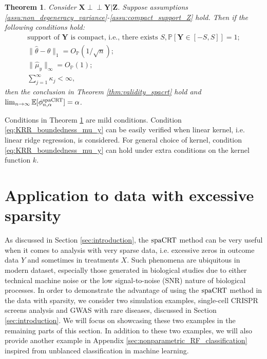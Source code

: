 \documentclass[12pt]{article}
\newtheorem{theorem}{Theorem}
\theoremstyle{definition}
\newcommand{\indep}{\perp \!\!\! \perp}
\def\P{\mathbb{P}}
\def\P{\mathbb{P}}
\newcommand{\E}{\mathbb E}								%
\renewcommand{\P}{\mathbb{P}}							%
\newcommand{\prx}{\bm X}								%
\newcommand{\prz}{\bm Z}								%
\newcommand{\pry}{{\bm Y}}								%
\newcommand{\spacrt}{\textnormal{spaCRT}}               %
\begin{document}
\begin{theorem}\label{thm:nonparametric_ml_spacrt}
  Consider $\prx\indep\pry|\prz$. Suppose assumptions \ref{assu:non_degeneracy_variance}-\ref{assu:compact_support_Z} hold. Then if the following conditions hold:
  \begin{align}
    \text{support of $\pry$ is compact, i.e., there exists }S, \P[\pry\in[-S,S]]=1;\label{eq:KRR_compact_support_Y}\\
    \|\widehat{\theta}-\theta\|_1=O_\P(1/\sqrt{n});\label{eq:KRR_mu_x_consistency}\\
    \|\widehat{\mu}_{y}\|_{\infty}=O_\P(1);\label{eq:KRR_boundedness_mu_y}\\
    \sum_{j=1}^{\infty}\kappa_j<\infty,\label{eq:KRR_kernel_function}
  \end{align}
  then the conclusion in Theorem \ref{thm:validity_spacrt} hold and $\lim_{n\rightarrow\infty}\E[\phi_{n,\alpha}^{\spacrt}]=\alpha$.
\end{theorem}

Conditions in Theorem \ref{thm:nonparametric_ml_spacrt} are mild conditions. Condition \eqref{eq:KRR_boundedness_mu_y} can be easily verified when linear kernel, i.e. linear ridge regression, is considered. For general choice of kernel, condition \eqref{eq:KRR_boundedness_mu_y} can hold under extra conditions on the kernel function $k$.

\section{Application to data with excessive sparsity}\label{sec:simulation} 

As discussed in Section \ref{sec:introduction}, the $\spacrt$ method can be very useful when it comes to analysis with very sparse data, i.e. excessive zeros in outcome data $Y$ and sometimes in treatments $X$. Such phenomena are ubiquitous in modern dataset, especially those generated in biological studies due to either technical machine noise or the low signal-to-noise (SNR) nature of biological processes. In order to demonstrate the advantage of using the $\spacrt$ method in the data with sparsity, we consider two simulation examples, single-cell CRISPR screens analysis and GWAS with rare diseases, discussed in Section \ref{sec:introduction}. We will focus on showcasing these two examples in the remaining parts of this section. In addition to these two examples, we will also provide another example in Appendix \ref{sec:nonparametric_RF_classification} inspired from unblanced classification in machine learning.
\end{document}
